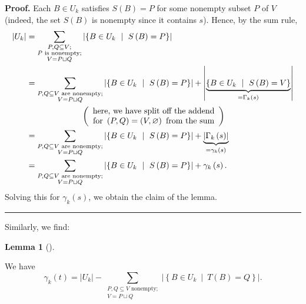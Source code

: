 \documentclass[numbers=enddot,12pt,final,onecolumn,notitlepage]{scrartcl}%
\theoremstyle{definition}
\newtheorem{lem}[theo]{Lemma}
\newenvironment{lemma}[1][]
{\begin{lem}[#1]\begin{leftbar}}
{\end{leftbar}\end{lem}}
\newenvironment{proof}[1][Proof]{\noindent\textbf{#1.} }{\ \rule{0.5em}{0.5em}}
\let\sumnonlimits\sum
\renewcommand{\sum}{\sumnonlimits\limits}
\theoremstyle{plainsl}
\begin{document}
\begin{proof}
Each $B\in U_{k}$ satisfies $S\left(  B\right)  =P$ for some nonempty subset
$P$ of $V$ (indeed, the set $S\left(  B\right)  $ is nonempty since it
contains $s$). Hence, by the sum rule,%
\begin{align*}
\left\vert U_{k}\right\vert  &  =\sum_{\substack{P,Q\subseteq V;\\P\text{ is
nonempty;}\\V=P\sqcup Q}}\left\vert \left\{  B\in U_{k}\ \mid\ S\left(
B\right)  =P\right\}  \right\vert \\
&  =\sum_{\substack{P,Q\subseteq V\text{ are nonempty;}\\V=P\sqcup
Q}}\left\vert \left\{  B\in U_{k}\ \mid\ S\left(  B\right)  =P\right\}
\right\vert +\left\vert \underbrace{\left\{  B\in U_{k}\ \mid\ S\left(
B\right)  =V\right\}  }_{=\Gamma_{k}\left(  s\right)  }\right\vert \\
&  \ \ \ \ \ \ \ \ \ \ \ \ \ \ \ \ \ \ \ \ \left(
\begin{array}
[c]{c}%
\text{here, we have split off the addend}\\
\text{for }\left(  P,Q\right)  =\left(  V,\varnothing\right)  \text{ from the
sum}%
\end{array}
\right) \\
&  =\sum_{\substack{P,Q\subseteq V\text{ are nonempty;}\\V=P\sqcup
Q}}\left\vert \left\{  B\in U_{k}\ \mid\ S\left(  B\right)  =P\right\}
\right\vert +\underbrace{\left\vert \Gamma_{k}\left(  s\right)  \right\vert
}_{=\gamma_{k}\left(  s\right)  }\\
&  =\sum_{\substack{P,Q\subseteq V\text{ are nonempty;}\\V=P\sqcup
Q}}\left\vert \left\{  B\in U_{k}\ \mid\ S\left(  B\right)  =P\right\}
\right\vert +\gamma_{k}\left(  s\right)  .
\end{align*}
Solving this for $\gamma_{k}\left(  s\right)  $, we obtain the claim of the lemma.
\end{proof}

Similarly, we find:

\begin{lemma}
\label{lem.new2}We have%
\[
\gamma_{k}\left(  t\right)  =\left\vert U_{k}\right\vert -\sum
_{\substack{P,Q\subseteq V\text{ nonempty;}\\V=P\sqcup Q}}\left\vert \left\{
B\in U_{k}\ \mid\ T\left(  B\right)  =Q\right\}  \right\vert .
\]

\end{lemma}
\end{document}
